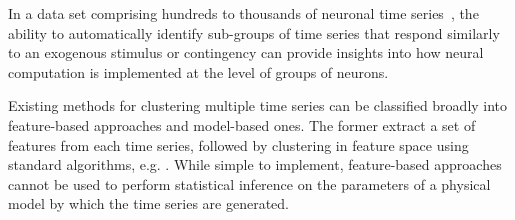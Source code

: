 \documentclass[twoside]{article}
\begin{document}
In a data set comprising hundreds to thousands of neuronal time series~\citep{brown2004multiple}, the ability to automatically identify sub-groups of time series that respond similarly to an exogenous stimulus or contingency can provide insights into how neural computation is implemented at the level of groups of neurons. %


Existing methods for clustering multiple time series can be classified broadly into feature-based approaches and model-based ones. The former extract a set of features  from each time series, followed by clustering in feature space using standard algorithms, e.g. \cite{humphries2011spike}. While simple to implement, feature-based approaches cannot be used to perform statistical inference on the parameters of a physical model by which the time series are generated. 
\end{document}
